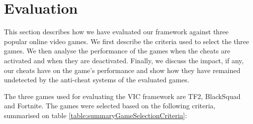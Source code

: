 
\section{Evaluation}
\label{sec:evaluation}


This section describes how we have evaluated our framework against three popular online video games. We first describe the criteria used to select the three games.  We then analyse the performance of the games when the cheats are activated and when they are deactivated. Finally, we discuss the impact, if any, our cheats have on the game's performance and show how they have remained undetected by the anti-cheat systems of the evaluated games.



The three games used for evaluating the VIC framework are TF2, BlackSquad and Fortnite. The games were selected based on the following criteria, summarised on table \ref{table:summaryGameSelectionCriteria}:  
